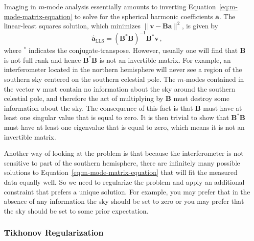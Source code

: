 \documentclass[twocolumn]{aastex61}
\renewcommand{\b}{\pmb}
\begin{document}
Imaging in $m$-mode analysis essentially amounts to inverting
Equation~\ref{eq:m-mode-matrix-equation} to solve for the spherical harmonic coefficients $\b a$.
The linear-least squares solution, which minimizes $\|\b v - \b B\b a\|^2$, is given by
\begin{equation}
    \b{\hat a}_\text{LLS} = (\b B^*\b B)^{-1}\b B^*\b v\,,
\end{equation}
where $^*$ indicates the conjugate-transpose. However, usually one will find that $\b B$ is not
full-rank and hence $\b B^*\b B$ is not an invertible matrix. For example, an interferometer located
in the northern hemisphere will never see a region of the southern sky centered on the southern
celestial pole. The $m$-modes contained in the vector $\b v$ must contain no information
about the sky around the southern celestial pole, and therefore the act of multiplying by $\b B$
must destroy some information about the sky. The consequence of this fact is that $\b B$ must have
at least one singular value that is equal to zero. It is then trivial to show that $\b B^*\b B$ must
have at least one eigenvalue that is equal to zero, which means it is not an invertible matrix.

Another way of looking at the problem is that because the interferometer is not sensitive to part of
the southern hemisphere, there are infinitely many possible solutions to
Equation~\ref{eq:m-mode-matrix-equation} that will fit the measured data equally well. So we need to
regularize the problem and apply an additional constraint that prefers a unique solution. For
example, you may prefer that in the absence of any information the sky should be set to zero or you
may prefer that the sky should be set to some prior expectation.

\subsubsection{Tikhonov Regularization}
\end{document}
